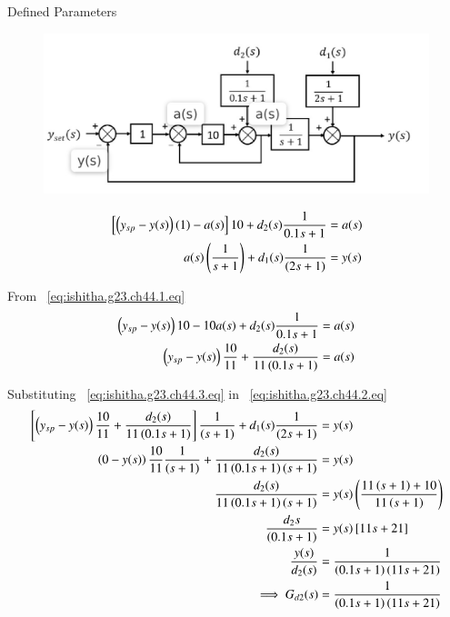 \documentclass[journal,12pt,onecolumn]{IEEEtran}
\theoremstyle{remark}
\begin{document}
\begin{table}[!ht]
    \centering
        
    \caption{Defined Parameters}
    \label{tab: ishithagatech44.t2}
\end{table}

\begin{figure}[h]
    \centering
    \includegraphics[scale=0.30]{../gate23.ch.44/figs/g44fig2.jpeg}
    \caption{ }
    \label{}
\end{figure}

\newpage

\begin{align}
{}\left[\left(y_{sp}-y(s)\right)(1) -a(s)\right]10+ d_2(s)\frac{1}{0.1s+1} &=a(s)  \label{eq:ishitha.g23.ch44.1.eq} \\
a(s)\left(\frac{1}{s+1}\right) + d_1(s)\frac{1}{(2s+1)} &=y(s)  \label{eq:ishitha.g23.ch44.2.eq}
\end{align}

From ~\eqref{eq:ishitha.g23.ch44.1.eq}
\begin{align}
\left(y_{sp}-y(s)\right)10 -10a(s) + d_2(s)\frac{1}{0.1s+1}&=a(s) \\
\left(y_{sp}-y(s)\right)\frac{10}{11} + \frac{d_2(s)}{11\left(0.1s+1\right)} &= a(s)  \label{eq:ishitha.g23.ch44.3.eq}
\end{align}

Substituting ~\eqref{eq:ishitha.g23.ch44.3.eq} in ~\eqref{eq:ishitha.g23.ch44.2.eq}
\begin{align}
{}\left[\left(y_{sp}-y(s)\right)\frac{10}{11} + \frac{d_2(s)}{11\left(0.1s+1\right)}  \right]\frac{1}{\left(s+1\right)} + d_1(s)\frac{1}{(2s+1)} &= y(s) \\
\left(0-y(s)\right)\frac{10}{11}\frac{1}{\left(s+1\right)} + \frac{d_2(s)}{11\left(0.1s+1\right)\left(s+1\right)} &= y(s) \\
\frac{d_2(s)}{11\left(0.1s+1\right)\left(s+1\right)} &= y(s)\left(\frac{11\left(s+1\right)+10}{11\left(s+1\right)}\right) \\
\frac{d_2{s}}{\left(0.1s+1\right)} &= y(s){}\left[11s+21\right] \\
\frac{y(s)}{d_2(s)} &= \frac{1}{\left(0.1s+1\right)\left(11s+21\right)} \\
\implies G_{d2}(s) &= \frac{1}{\left(0.1s+1\right)\left(11s+21\right)}
\end{align}
\end{document}
